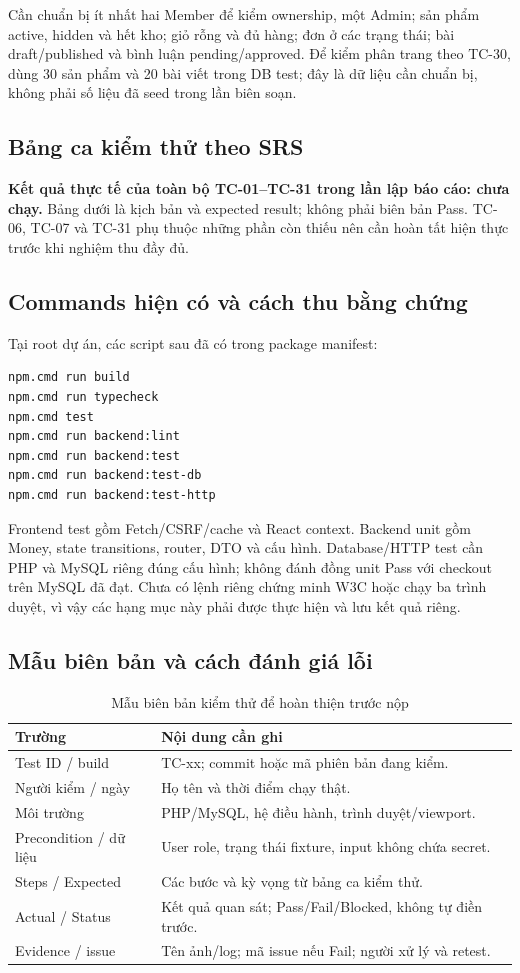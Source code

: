 Cần chuẩn bị ít nhất hai Member để kiểm ownership, một Admin; sản phẩm active, hidden và hết kho; giỏ rỗng và đủ hàng; đơn ở các trạng thái; bài draft/published và bình luận pending/approved. Để kiểm phân trang theo TC-30, dùng 30 sản phẩm và 20 bài viết trong DB test; đây là dữ liệu cần chuẩn bị, không phải số liệu đã seed trong lần biên soạn.

\subsection{Bảng ca kiểm thử theo SRS}
\textbf{Kết quả thực tế của toàn bộ TC-01–TC-31 trong lần lập báo cáo: chưa chạy.} Bảng dưới là kịch bản và expected result; không phải biên bản Pass. TC-06, TC-07 và TC-31 phụ thuộc những phần còn thiếu nên cần hoàn tất hiện thực trước khi nghiệm thu đầy đủ.


\subsection{Commands hiện có và cách thu bằng chứng}
Tại root dự án, các script sau đã có trong package manifest:
\begin{lstlisting}[caption={Các lệnh kiểm tra ứng dụng; chưa thực thi trong lần soạn báo cáo}]
npm.cmd run build
npm.cmd run typecheck
npm.cmd test
npm.cmd run backend:lint
npm.cmd run backend:test
npm.cmd run backend:test-db
npm.cmd run backend:test-http
\end{lstlisting}
Frontend test gồm Fetch/CSRF/cache và React context. Backend unit gồm Money, state transitions, router, DTO và cấu hình. Database/HTTP test cần PHP và MySQL riêng đúng cấu hình; không đánh đồng unit Pass với checkout trên MySQL đã đạt. Chưa có lệnh riêng chứng minh W3C hoặc chạy ba trình duyệt, vì vậy các hạng mục này phải được thực hiện và lưu kết quả riêng.

\subsection{Mẫu biên bản và cách đánh giá lỗi}
\begin{table}[H]\centering
\caption{Mẫu biên bản kiểm thử để hoàn thiện trước nộp}\label{tab:test-record}
\begin{tabularx}{\linewidth}{@{}P{3.7cm}Y@{}}\toprule
Trường & Nội dung cần ghi\\\midrule
Test ID / build & TC-xx; commit hoặc mã phiên bản đang kiểm.\\
Người kiểm / ngày & Họ tên và thời điểm chạy thật.\\
Môi trường & PHP/MySQL, hệ điều hành, trình duyệt/viewport.\\
Precondition / dữ liệu & User role, trạng thái fixture, input không chứa secret.\\
Steps / Expected & Các bước và kỳ vọng từ bảng ca kiểm thử.\\
Actual / Status & Kết quả quan sát; Pass/Fail/Blocked, không tự điền trước.\\
Evidence / issue & Tên ảnh/log; mã issue nếu Fail; người xử lý và retest.\\
\bottomrule\end{tabularx}
\end{table}


